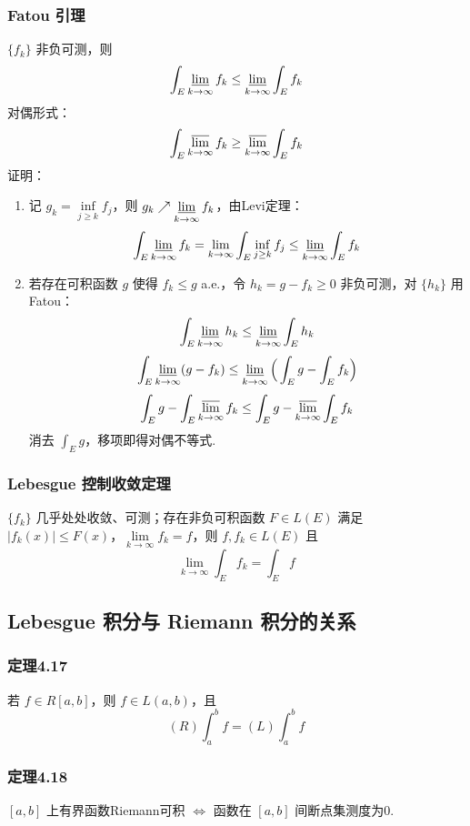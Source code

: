 \documentclass{article}
\begin{document}
	\subsubsection{Fatou 引理}
	$\{f_k\}$ 非负可测，则
	\[
	\displaystyle \int_E \varliminf_{k\to\infty} f_k
	\le \varliminf_{k\to\infty} \int_E f_k
	\]
	对偶形式：
	\[
	\displaystyle \int_E \varlimsup_{k\to\infty} f_k
	\ge \varlimsup_{k\to\infty} \int_E f_k
	\]
	证明：
	\begin{enumerate}
		\item 记 $g_k = \inf\limits_{j\ge k}f_j$，则 $g_k\nearrow \varliminf\limits_{k\to\infty}f_k$，由Levi定理：
		\[
		\int_E \varliminf_{k\to\infty} f_k
		= \lim_{k\to\infty}\int_E \inf_{j\ge k}f_j
		\le \varliminf_{k\to\infty}\int_E f_k
		\]
		\item 若存在可积函数 $g$ 使得 $f_k\le g$ a.e.，令 $h_k = g-f_k \ge 0$ 非负可测，对 $\{h_k\}$ 用Fatou：
		\[
		\int_E \varliminf_{k\to\infty} h_k
		\le \varliminf_{k\to\infty}\int_E h_k
		\]
		\[
		\int_E \varliminf_{k\to\infty}(g-f_k)
		\le \varliminf_{k\to\infty}\Big(\int_E g - \int_E f_k\Big)
		\]
		\[
		\int_E g - \int_E \varlimsup_{k\to\infty}f_k
		\le \int_E g - \varlimsup_{k\to\infty}\int_E f_k
		\]
		消去 $\int_E g$，移项即得对偶不等式.
	\end{enumerate}
	
	\subsubsection{Lebesgue 控制收敛定理}
	$\{f_k\}$ 几乎处处收敛、可测；存在非负可积函数 $F\in L(E)$ 满足 $|f_k(x)|\le F(x)$，$\lim\limits_{k\to\infty}f_k = f$，则 $f,f_k\in L(E)$ 且
	\[
	\displaystyle \lim_{k\to\infty}\int_E f_k = \int_E f
	\]
	
	\subsection{Lebesgue 积分与 Riemann 积分的关系}
	\subsubsection{定理4.17}
	若 $f\in R[a,b]$，则 $f\in L(a,b)$，且
	\[
	\displaystyle (R)\int_a^b f = (L)\int_a^b f
	\]
	
	\subsubsection{定理4.18}
	$[a,b]$ 上有界函数Riemann可积 $\iff$ 函数在 $[a,b]$ 间断点集测度为0.
	
\end{document}
